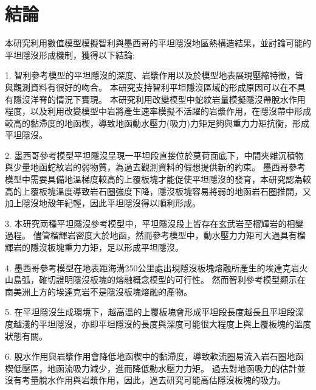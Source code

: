 
\chapter{結論}

本研究利用數值模型模擬智利與墨西哥的平坦隱沒地區熱構造結果，並討論可能的平坦隱沒形成機制，獲得以下結論:

1. 智利參考模型的平坦隱沒的深度、岩漿作用以及於模型地表展現壓縮特徵，皆與觀測資料有很好的吻合。
本研究支持智利平坦隱沒區域的形成原因可以在不具有隱沒洋脊的情況下實現。
本研究利用改變模型中蛇紋岩量模擬隱沒帶脫水作用程度，以及利用改變模型中岩將產生速率模擬不活躍的岩漿作用，在隱沒帶中形成較高的黏滯度的地函楔，導致地函動水壓力(吸力)力矩足夠與重力力矩抗衡，形成平坦隱沒。

2. 墨西哥參考模型平坦隱沒呈現一平坦段直接位於莫荷面底下，中間夾雜沉積物與少量地函蛇紋岩的弱物質，為過去觀測資料的假想提供新的約束。
墨西哥參考模型中需要具備地溫梯度較高的上覆板塊才能促使平坦隱沒的發育，本研究認為較高的上覆板塊溫度導致岩石圈強度下降，隱沒板塊容易將弱的地函岩石圈推開，又加上隱沒地殼年紀輕，因此平坦隱沒得以順利形成。

3. 本研究兩種平坦隱沒參考模型中，平坦隱沒段上皆存在玄武岩至榴輝岩的相變過程。
儘管榴輝岩密度大於地函，然而參考模型中，動水壓力力矩可大過具有榴輝岩的隱沒板塊重力力矩，足以形成平坦隱沒。


4. 墨西哥參考模型在地表距海溝250公里處出現隱沒板塊熔融所產生的埃達克岩火山島弧，確切證明隱沒板塊的熔融概念模型的可行性。
然而智利參考模型顯示在南美洲上方的埃達克岩不是隱沒板塊熔融的產物。

5. 在平坦隱沒生成環境下，越高溫的上覆板塊會形成平坦段長度越長且平坦段深度越淺的平坦隱沒，亦即平坦隱沒的長度與深度可能很大程度上與上覆板塊的溫度狀態有關。

6. 脫水作用與岩漿作用會降低地函楔中的黏滯度，導致軟流圈易流入岩石圈地函楔低壓區，地函流吸力減少，進而降低動水壓力力矩。
過去對地函吸力的估計並沒有考量脫水作用與岩漿作用，因此，過去研究可能高估隱沒板塊的吸力。